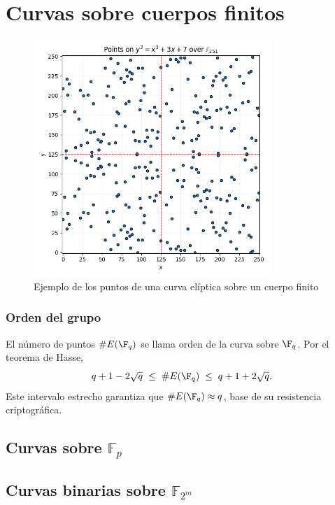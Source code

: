 \section{Curvas sobre cuerpos finitos}\label{sec:curvas_sobre_cuerpos_finitos}
\begin{figure}[H]
    \centering
    \includegraphics[width=0.8\textwidth]{imagenes/points_finite_field_251.png}
    \caption{Ejemplo de los puntos de una curva elíptica sobre un cuerpo finito}
    \label{fig:points_finite_field_251}
\end{figure}

\subsubsection*{Orden del grupo}

El número de puntos \(\#E(\F_q)\) se llama orden de la curva sobre \(\F_q\). Por el teorema de Hasse,
\[
  q + 1 - 2\sqrt{q} \;\le\;\#E(\F_q)\;\le\;q + 1 + 2\sqrt{q}.
\]
Este intervalo estrecho garantiza que \(\#E(\F_q)\approx q\), base de su resistencia criptográfica.
\subsection{Curvas sobre \texorpdfstring{$\mathbb{F}_p$}{Fp}}\label{sec:curvas_sobre_cuerpos_finitos_primos}
\subsection{Curvas binarias sobre \texorpdfstring{$\mathbb{F}_{2^m}$}{F2m}}\label{sec:curvas_sobre_cuerpos_finitos_binarios}

